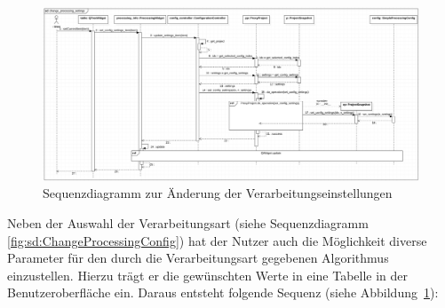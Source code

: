 \documentclass{article}
\begin{document}
\begin{figure}[H]%
    \centering
    \includegraphics[width=13cm]{entwurf/Entwurf_dokument/img/Michael/sd_change_processing_settings.png}
    \caption{Sequenzdiagramm zur Änderung der Verarbeitungseinstellungen}
    \label{fig:sd:ChangeProcessingSettings}
\end{figure}

Neben der Auswahl der Verarbeitungsart (siehe Sequenzdiagramm \ref{fig:sd:ChangeProcessingConfig}) hat der Nutzer auch die Möglichkeit diverse Parameter für den durch die Verarbeitungsart gegebenen Algorithmus einzustellen. Hierzu trägt er die gewünschten Werte in eine Tabelle in der Benutzeroberfläche ein. Daraus entsteht folgende Sequenz (siehe Abbildung~\ref{fig:sd:ChangeProcessingSettings}):
\end{document}
